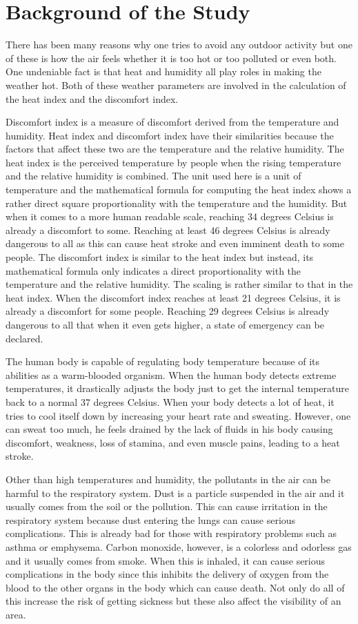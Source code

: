 \section{Background of the Study}

There has been many reasons why one tries to avoid any outdoor activity but one of these is how the air feels whether it is too hot or too polluted or even both. One undeniable fact is that heat and humidity all play roles in making the weather hot. Both of these weather parameters are involved in the calculation of the heat index and the discomfort index.
\par \noindent
Discomfort index is a measure of discomfort derived from the temperature and humidity. Heat index and discomfort index have their similarities because the factors that affect these two are the temperature and the relative humidity. The heat index is the perceived temperature by people when the rising temperature and the relative humidity is combined. The unit used here is a unit of temperature and the mathematical formula for computing the heat index shows a rather direct square proportionality with the temperature and the humidity. But when it comes to a more human readable scale, reaching 34 degrees Celsius is already a discomfort to some. Reaching at least 46 degrees Celsius is already dangerous to all as this can cause heat stroke and even imminent death to some people. The discomfort index is similar to the heat index but instead, its mathematical formula only indicates a direct proportionality with the temperature and the relative humidity. The scaling is rather similar to that in the heat index. When the discomfort index reaches at least 21 degrees Celsius, it is already a discomfort for some people. Reaching 29 degrees Celsius is already dangerous to all that when it even gets higher, a state of emergency can be declared.
\par \noindent
The human body is capable of regulating body temperature because of its abilities as a warm-blooded organism. When the human body detects extreme temperatures, it drastically adjusts the body just to get the internal temperature back to a normal 37 degrees Celsius. When your body detects a lot of heat, it tries to cool itself down by increasing your heart rate and sweating. However, one can sweat too much, he feels drained by the lack of fluids in his body causing discomfort, weakness, loss of stamina, and even muscle pains, leading to a heat stroke.
\par \noindent
Other than high temperatures and humidity, the pollutants in the air can be harmful to the respiratory system. Dust is a particle suspended in the air and it usually comes from the soil or the pollution. This can cause irritation in the respiratory system because dust entering the lungs can cause serious complications. This is already bad for those with respiratory problems such as asthma or emphysema. Carbon monoxide, however, is a colorless and odorless gas and it usually comes from smoke. When this is inhaled, it can cause serious complications in the body since this inhibits the delivery of oxygen from the blood to the other organs in the body which can cause death. Not only do all of this increase the risk of getting sickness but these also affect the visibility of an area.
